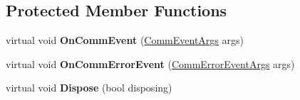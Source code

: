 \subsection*{Protected Member Functions}
\begin{DoxyCompactItemize}
\item 
\mbox{\label{class_r_j_c_p_1_1_i_o_1_1_ports_1_1_native_1_1_windows_1_1_comm_overlapped_io_a35405e87832b9258577e3cbdba498207}} 
virtual void {\bfseries On\+Comm\+Event} (\mbox{\hyperlink{class_r_j_c_p_1_1_i_o_1_1_ports_1_1_native_1_1_windows_1_1_comm_event_args}{Comm\+Event\+Args}} args)
\item 
\mbox{\label{class_r_j_c_p_1_1_i_o_1_1_ports_1_1_native_1_1_windows_1_1_comm_overlapped_io_a7b31d70d0d1c6a71bbbbcd8596c92fd3}} 
virtual void {\bfseries On\+Comm\+Error\+Event} (\mbox{\hyperlink{class_r_j_c_p_1_1_i_o_1_1_ports_1_1_native_1_1_windows_1_1_comm_error_event_args}{Comm\+Error\+Event\+Args}} args)
\item 
\mbox{\label{class_r_j_c_p_1_1_i_o_1_1_ports_1_1_native_1_1_windows_1_1_comm_overlapped_io_acc19e21f84f62468ae506e55ccc13eb7}} 
virtual void {\bfseries Dispose} (bool disposing)
\end{DoxyCompactItemize}
